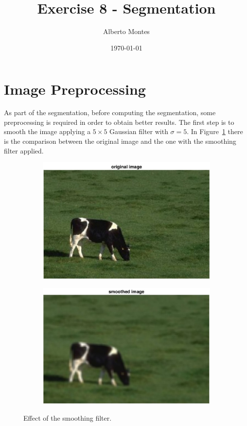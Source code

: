 \documentclass{ethz_report}
\title{Exercise 8 - Segmentation}
\author{Alberto Montes}
\date{\today}
\begin{document}
\maketitle

\section*{Image Preprocessing}

As part of the segmentation, before computing the segmentation, some preprocessing is required in order to obtain better results. The first step is to smooth the image applying a $5 \times 5$ Gaussian filter with $\sigma=5$.
In Figure~\ref{fig:smoothing} there is the comparison between the original image and the one with the smoothing filter applied.

\begin{figure}[h]
    \centering
    \begin{subfigure}[b]{.5\textwidth}
        \centering
        \includegraphics[width=1\linewidth]{images/original}
    \end{subfigure}%
    \begin{subfigure}[b]{.5\textwidth}
        \centering
        \includegraphics[width=1\linewidth]{images/smoothed}
    \end{subfigure}
    \caption{Effect of the smoothing filter.}
    \label{fig:smoothing}
\end{figure}
\end{document}
